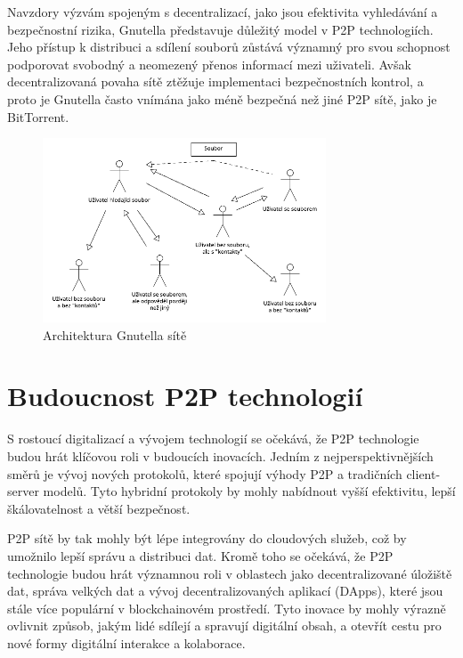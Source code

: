 \documentclass[10pt,twoside,czech,a4paper]{article}
\begin{document}
Navzdory výzvám spojeným s decentralizací, jako jsou efektivita vyhledávání a bezpečnostní rizika, Gnutella představuje důležitý model v P2P technologiích.
Jeho přístup k distribuci a sdílení souborů zůstává významný pro svou schopnost podporovat svobodný a neomezený přenos informací mezi uživateli.
Avšak decentralizovaná povaha sítě ztěžuje implementaci bezpečnostních kontrol, a proto je Gnutella často vnímána jako méně bezpečná než jiné P2P sítě, jako je BitTorrent.

\begin{figure}[H]
	\centering
	\includegraphics[width=0.75\textwidth]{Gnutella.png}
	\caption{Architektura Gnutella sítě}
\end{figure}


\section{Budoucnost P2P technologií}

S rostoucí digitalizací a vývojem technologií se očekává, že P2P technologie budou hrát klíčovou roli v budoucích inovacích.
Jedním z nejperspektivnějších směrů je vývoj nových protokolů, které spojují výhody P2P a tradičních client-server modelů.
Tyto hybridní protokoly by mohly nabídnout vyšší efektivitu, lepší škálovatelnost a větší bezpečnost.

P2P sítě by tak mohly být lépe integrovány do cloudových služeb, což by umožnilo lepší správu a distribuci dat.
Kromě toho se očekává, že P2P technologie budou hrát významnou roli v oblastech jako decentralizované úložiště dat, správa velkých dat a vývoj decentralizovaných aplikací (DApps), které jsou stále více populární v blockchainovém prostředí.
Tyto inovace by mohly výrazně ovlivnit způsob, jakým lidé sdílejí a spravují digitální obsah, a otevřít cestu pro nové formy digitální interakce a kolaborace.\cite{Kisembe2017}
\end{document}

